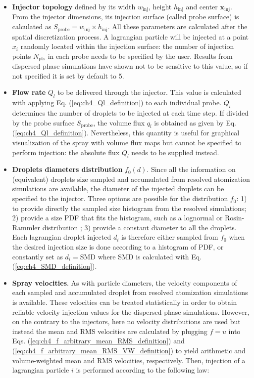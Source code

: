 \begin{itemize}

	\item \textbf{Injector topology} defined by its width $w_\mathrm{inj}$, height $h_\mathrm{inj}$ and center $\textbf{x}_\mathrm{inj}$. From the injector dimensions, its injection surface (called probe surface) is calculated as $S_\mathrm{probe} = w_\mathrm{inj} \times h_\mathrm{inj}$. All these parameters are calculated after the spatial discretization process. A lagrangian particle will be injected at a point $x_i$ randomly located within the injection surface: the number of injection points $N_\mathrm{pts}$ in each probe needs to be specified by the user. Results from dispersed phase simulations have shown not to be sensitive to this value, so if not specified it is set by default to 5.
	
	\item \textbf{Flow rate} $Q_l$ to be delivered through the injector. This value is calculated with applying Eq. (\ref{eq:ch4_Ql_definition}) to each individual probe. $Q_l$ determines the number of droplets to be injected at each time step. If divided by the probe surface $S_\mathrm{probe}$, the volume flux $q_l$ is obtained as given by Eq. (\ref{eq:ch4_Ql_definition}). Nevertheless, this quantity is useful for graphical visualization of the spray with volume flux maps but cannot be specified to perform injection: the absolute flux $Q_l$ needs to be supplied instead.
	
	\item \textbf{Droplets diameters distribution} $f_0 \left( d \right)$. Since all the information on (equivalent) droplets size sampled and accumulated from resolved atomization simulations are available, the diameter of the injected droplets can be specified to the injector. Three options are possible for the distribution $f_0$: 1) to provide directly the sampled size histogram from the resolved simulations; 2) provide a size PDF that fits the histogram, such as a lognormal or Rosin-Rammler distribution ; 3) provide a constant diameter to all the droplets. Each lagrangian droplet injected $d_i$ is therefore either sampled from $f_0$ when the desired injection size is done according to a histogram of PDF, or constantly set as $d_i = \mathrm{SMD}$ where SMD is calculated with Eq. (\ref{eq:ch4_SMD_definition}).
	
	\item \textbf{Spray velocities}. As with particle diameters, the velocity components of each sampled and accumulated droplet from resolved atomization simulations is available. These velocities can be treated statistically in order to obtain reliable velocity injection values for the dispersed-phase simulations. However, on the contrary to the injectors, here no velocity distributions are used but instead the mean and RMS velocities are calculated by plugging $f = u$ into Eqs. (\ref{eq:ch4_f_arbitrary_mean_RMS_definition}) and (\ref{eq:ch4_f_arbitrary_mean_RMS_VW_definition}) to yield arithmetic and volume-weighted mean and RMS velocities, respectively. Then, injection of a lagrangian particle $i$ is performed according to the following law:
	

\end{itemize}
